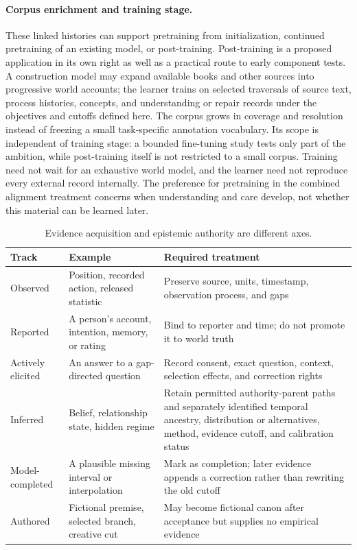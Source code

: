 \documentclass[10pt]{article}
\begin{document}
\paragraph{Corpus enrichment and training stage.}
These linked histories can support pretraining from initialization, continued
pretraining of an existing model, or post-training. Post-training is a proposed
application in its own right as well as a practical route to early component
tests. A construction model may expand available books and other sources into
progressive world accounts; the learner trains on selected traversals of source
text, process histories, concepts, and understanding or repair records under
the objectives and cutoffs defined here. The corpus grows in coverage and
resolution instead of freezing a small task-specific annotation vocabulary.
Its scope is independent of training stage: a bounded fine-tuning study tests
only part of the ambition, while post-training itself is not restricted to a
small corpus. Training need not wait for an exhaustive world model, and the
learner need not reproduce every external record internally. The preference
for pretraining in the combined alignment treatment concerns when understanding
and care develop, not whether this material can be learned later.

\begin{table}[H]
\centering
\scriptsize
\begin{tabularx}{\textwidth}{@{}p{}p{}Y@{}}
\toprule
Track & Example & Required treatment \\
\midrule
Observed & Position, recorded action, released statistic & Preserve source, units, timestamp, observation process, and gaps \\
Reported & A person's account, intention, memory, or rating & Bind to reporter and time; do not promote it to world truth \\
Actively elicited & An answer to a gap-directed question & Record consent, exact question, context, selection effects, and correction rights \\
Inferred & Belief, relationship state, hidden regime & Retain permitted authority-parent paths and separately identified temporal ancestry, distribution or alternatives, method, evidence cutoff, and calibration status \\
Model-completed & A plausible missing interval or interpolation & Mark as completion; later evidence appends a correction rather than rewriting the old cutoff \\
Authored & Fictional premise, selected branch, creative cut & May become fictional canon after acceptance but supplies no empirical evidence \\
\bottomrule
\end{tabularx}
\caption{Evidence acquisition and epistemic authority are different axes.}
\label{tab:epistemic-tracks-method}
\end{table}
\end{document}
